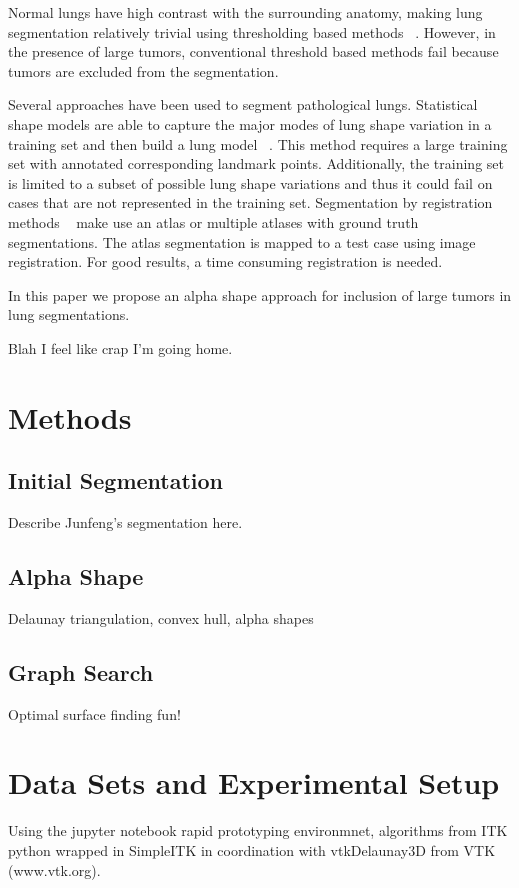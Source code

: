 \documentclass{llncs}
\begin{document}
Normal lungs have high contrast with the surrounding anatomy, making lung segmentation relatively trivial using thresholding based methods ~\cite{guo2008,hu2001}. However, in the presence of large tumors, conventional threshold based methods fail because tumors are excluded from the segmentation.

Several approaches have been used to segment pathological lungs. Statistical shape models are able to capture the major modes of lung shape variation in a training set and then build a lung model ~\cite{sun2012,sofka2011}. This method requires a large training set with annotated corresponding landmark points. Additionally, the training set is limited to a subset of possible lung shape variations and thus it could fail on cases that are not represented in the training set. Segmentation by registration methods ~\cite{sluimer2005,vanrikxoort2009} make use an atlas or multiple atlases with ground truth segmentations. The atlas segmentation is mapped to a test case using image registration. For good results, a time consuming registration is needed.

In this paper we propose an alpha shape approach for inclusion of large tumors in lung segmentations. 

Blah I feel like crap I'm going home.



%
\section{Methods}
%

%
\subsection{Initial Segmentation}
%
Describe Junfeng's segmentation here.
%
\subsection{Alpha Shape}
%
Delaunay triangulation, convex hull, alpha shapes
%
\subsection{Graph Search}
%
Optimal surface finding fun!
%
\section{Data Sets and Experimental Setup}
%
Using the jupyter notebook \cite{PER-GRA:2007} rapid prototyping environmnet,  algorithms from ITK\cite{johnson2015itk} python wrapped in SimpleITK \cite{10.3389/fninf.2013.00045} in coordination with vtkDelaunay3D from VTK (www.vtk.org).
\end{document}
